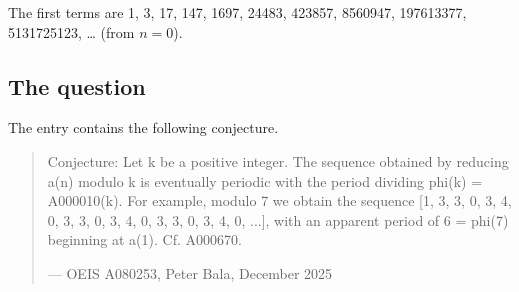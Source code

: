 \documentclass[11pt,a4paper]{article}
\theoremstyle{definition}
\theoremstyle{remark}
\begin{document}
The first terms are 1, 3, 17, 147, 1697, 24483, 423857, 8560947, 197613377, 5131725123, \dots{} (from $n=0$).

\subsection{The question}
The entry contains the following conjecture.
\begin{quote}\small\ttfamily\raggedright Conjecture: Let k be a positive integer. The sequence obtained by reducing a(n) modulo k is eventually periodic with the period dividing phi(k) = A000010(k). For example, modulo 7 we obtain the sequence [1, 3, 3, 0, 3, 4, 0, 3, 3, 0, 3, 4, 0, 3, 3, 0, 3, 4, 0, ...], with an apparent period of 6 = phi(7) beginning at a(1). Cf. A000670.\par\smallskip\hfill\textrm{--- OEIS A080253, Peter Bala, December 2025}\end{quote}
\end{document}
